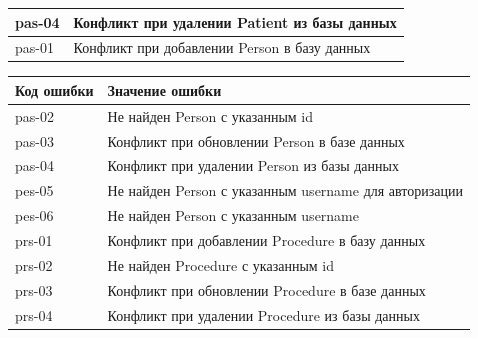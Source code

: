 \documentclass[a4paper,article]{article}
\begin{document}
\begin{sloppypar}
\begin{appendices}
\begin{xltabular}{\textwidth} { |
                >{\hsize} X |
                >{\hsize} X | }
            \hline
            pas-04
            & Конфликт при удалении Patient из базы данных \\
            
            \hline
            pas-01
            & Конфликт при добавлении Person в базу данных \\
            
            \hline
        \end{xltabular}
            
        \begin{xltabular}{\textwidth} { |
                >{\hsize} X |
                >{\hsize} X | }
                
            \hline
            Код ошибки
            & Значение ошибки \\
                
            \hline
            pas-02
            & Не найден Person с указанным id \\
            
            \hline
            pas-03
            & Конфликт при обновлении Person в базе данных \\
            
            \hline
            pas-04
            & Конфликт при удалении Person из базы данных \\
            
            \hline
            pes-05
            & Не найден Person с указанным username для авторизации \\
            
            \hline
            pes-06
            & Не найден Person с указанным username \\
            
            \hline
            prs-01
            & Конфликт при добавлении Procedure в базу данных \\
            
            \hline
            prs-02
            & Не найден Procedure с указанным id \\
            
            \hline
            prs-03
            & Конфликт при обновлении Procedure в базе данных \\
            
            \hline
            prs-04
            & Конфликт при удалении Procedure из базы данных \\
            

\end{xltabular}
\end{appendices}
\end{sloppypar}
\end{document}
